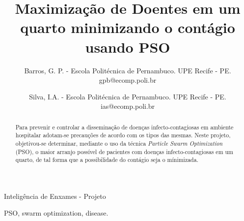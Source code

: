\documentclass[journal]{IEEEtran}
\begin{document}
%
\title{Maximização de Doentes em um quarto minimizando o contágio usando PSO}
%
%
%

\author{Barros, G. P. - Escola Politécnica de Pernambuco. UPE
	Recife - PE.\\
	gpb@ecomp.poli.br\\
	\and
	Silva, I.A. - Escola Politécnica de Pernambuco. UPE
	Recife - PE.\\
	ias@ecomp.poli.br%
}%

% 
%

%
{Inteligência de Enxames - Projeto}

\maketitle

\begin{abstract}
Para prevenir e controlar a disseminação de doenças infecto-contagiosas em ambiente hospitalar adotam-se precauções de acordo com os tipos das mesmas. Neste projeto, objetivou-se determinar, mediante o uso da técnica \textit{Particle Swarm Optimization}	(PSO), o maior arranjo possível de pacientes com doenças infecto-contagiosas em um quarto, de tal forma que a possibilidade do contágio seja o mínimizada. 
\end{abstract}

\begin{IEEEkeywords}
PSO, swarm optimization, disease.
\end{IEEEkeywords}
\end{document}
